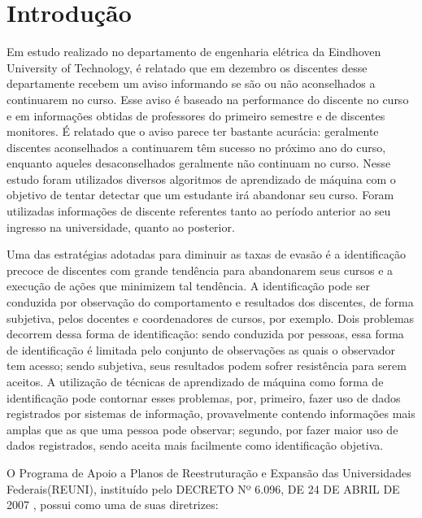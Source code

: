 \chapter{Introdução}


\cite{EDM_brasil}
Em estudo realizado no departamento de engenharia elétrica da Eindhoven University of Technology\cite{Predicting_Students}, é relatado que em dezembro os discentes desse departamente recebem um aviso informando se são ou não aconselhados a continuarem no curso. Esse aviso é baseado na performance do discente no curso e em informações obtidas de professores do primeiro semestre e de discentes monitores. É relatado que o aviso parece ter bastante acurácia: geralmente discentes aconselhados a continuarem têm sucesso no próximo ano do curso, enquanto aqueles desaconselhados geralmente não continuam no curso. Nesse estudo foram utilizados diversos algoritmos de aprendizado de máquina com o objetivo de tentar detectar que um estudante irá abandonar seu curso. Foram utilizadas informações de discente referentes tanto ao período anterior ao seu ingresso na universidade, quanto ao posterior. 

Uma das estratégias adotadas para diminuir as taxas de evasão é a identificação precoce de discentes com grande tendência para abandonarem seus cursos e a execução de ações que minimizem tal tendência. A identificação pode ser conduzida por observação do comportamento e resultados dos discentes, de forma subjetiva, pelos docentes e coordenadores de cursos, por exemplo. Dois problemas decorrem dessa forma de identificação: sendo conduzida por pessoas, essa forma de identificação é limitada pelo conjunto de observações as quais o observador tem acesso; sendo subjetiva, seus resultados podem sofrer resistência para serem aceitos. A utilização de técnicas de aprendizado de máquina como forma de identificação pode contornar esses problemas, por, primeiro, fazer uso de dados registrados por sistemas de informação, provavelmente contendo informações mais amplas que as que uma pessoa pode observar; segundo, por fazer maior uso de dados registrados, sendo aceita mais facilmente como identificação objetiva. 

O Programa de Apoio a Planos de Reestruturação e Expansão das Universidades Federais(REUNI), instituído pelo DECRETO Nº 6.096, DE 24 DE ABRIL DE 2007 , possui como uma de suas diretrizes:

